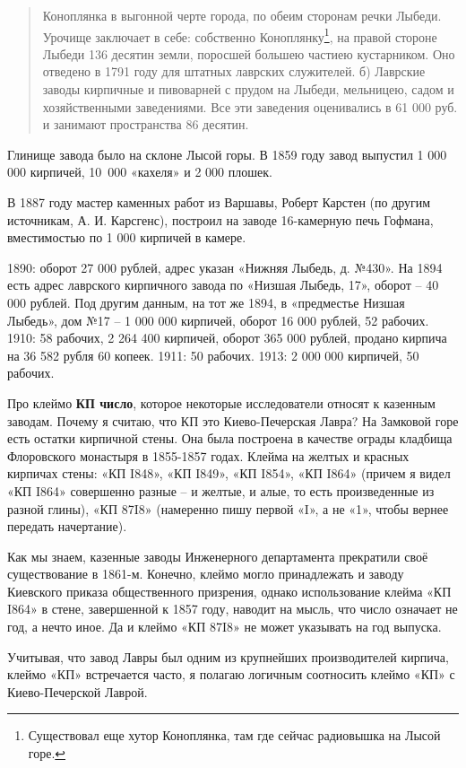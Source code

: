 \begin{quotation}
Коноплянка в выгонной черте города, по обеим сторонам речки Лыбеди. Урочище заключает в себе: собственно Коноплянку\footnote{Существовал еще хутор Коноплянка, там где сейчас радиовышка на Лысой горе.}, на правой стороне Лыбеди 136 десятин земли, поросшей большею частиею кустарником. Оно отведено в 1791 году для штатных лаврских служителей. б) Лаврские заводы кирпичные и пивоварней с прудом на Лыбеди, мельницею, садом и хозяйственными заведениями. Все эти заведения оценивались в 61 000 руб. и занимают пространства 86 десятин.
\end {quotation}

Глинище завода было на склоне Лысой горы. 
В 1859 году завод выпустил 1 000 000 кирпичей, \mbox{10 000} «кахеля» и 2 000 плошек.

В 1887 году мастер каменных работ из Варшавы,  Роберт Карстен (по другим источникам, А. И. Карсгенс), построил на заводе 16-камерную печь Гофмана, вместимостью по 1 000 кирпичей в камере.

1890: оборот 27 000 рублей, адрес указан «Нижняя Лыбедь, д. №430». На 1894 есть адрес лаврского кирпичного завода по «Низшая Лыбедь, 17», оборот – 40 000 рублей. Под другим данным, на тот же 1894, в «предместье Низшая Лыбедь», дом №17 – 1 000 000 кирпичей, оборот 16 000 рублей, 52 рабочих. 1910: 58 рабочих, 2 264 400 кирпичей, оборот 365 000 рублей, продано кирпича на 36 582 рубля 60 копеек. 1911: 50 рабочих. 1913: 2 000 000 кирпичей, 50 рабочих.

Про клеймо \textbf{КП число}, которое некоторые исследователи относят к казенным заводам. Почему я считаю, что КП это Киево-Печерская Лавра? На Замковой горе есть остатки кирпичной стены. Она была построена в качестве ограды кладбища Флоровского монастыря в 1855-1857 годах. Клейма на желтых и красных кирпичах стены: «КП I848», «КП I849», «КП I854», «КП I864» (причем я видел «КП I864» совершенно разные – и желтые, и алые, то есть произведенные из разной глины), «КП 87I8» (намеренно пишу первой «I», а не «1», чтобы вернее передать начертание). 

Как мы знаем, казенные заводы Инженерного департамента прекратили своё существование в 1861-м. Конечно, клеймо могло принадлежать и заводу Киевского приказа общественного призрения, однако использование клейма «КП I864» в стене, завершенной к 1857 году, наводит на мысль, что число означает не год, а нечто иное. Да и клеймо «КП 87I8» не может указывать на год выпуска.

Учитывая, что завод Лавры был одним из крупнейших производителей кирпича, клеймо «КП» встречается часто, я полагаю логичным соотносить клеймо «КП» с Киево-Печерской Лаврой.\\ 

